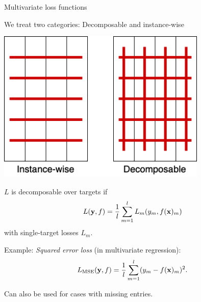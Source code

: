 \documentclass[11pt,compress,t,notes=noshow, xcolor=table]{beamer}
\begin{document}
\begin{frame}{Multivariate loss functions}
	\begin{itemize}
		\begin{minipage}{0.45\textwidth}	
			\item We treat two categories: Decomposable and instance-wise
		\end{minipage}
		\begin{minipage}{0.45\textwidth}
			\begin{center}
				\includegraphics[width=0.75\textwidth]{figure/fmeasure}
			\end{center}
		\end{minipage}
		
		\item $L$ is decomposable over targets if
		$$
		L(\mathbf{y}, f) = \frac{1}{l} \sum_{m=1}^l L_m(y_m, f(\mathbf{x})_m) 
		$$
		with single-target losses $L_m$.     
     
		\item Example: \emph{Squared error loss} (in multivariate regression):
		$$
		L_{\text{MSE}}(\mathbf{y}, f) = \frac{1}{l}\sum_{m=1}^l (y_m - f(\mathbf{x})_m)^2.
		$$
        \item Can also be used for cases with missing entries.
		
	\end{itemize}
\end{frame}
\end{document}
